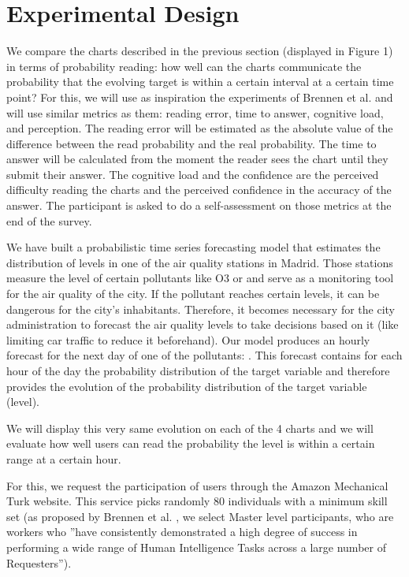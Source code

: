 \documentclass[a4paper,3p,sort&compress]{elsarticle}
\begin{document}
\section{Experimental Design}
\label{sec:exp_design}

We compare the charts described in the previous section (displayed in Figure 1)
in terms of probability
reading: how well
can the charts communicate the probability that the evolving target is within a certain interval
at a certain time point?
 For this, we will use as inspiration the experiments of Brennen et al. \cite{brennen_instrument_2018}
and will use similar metrics
as them: reading error, time to answer, cognitive load, and perception. The reading error will be estimated as the
absolute value of the difference between the read probability and the real probability. The time to answer
will be calculated from the moment the reader sees the chart until they submit their answer. The cognitive
load and the confidence are the perceived difficulty reading the charts and the perceived confidence in
the accuracy of
the answer. The participant is asked to do a self-assessment on those metrics at the end of the survey.

We have built a probabilistic time series forecasting model that estimates the distribution of \no
levels in one of the air quality stations in Madrid. Those stations measure the level of certain
pollutants like O3 or \no and serve as a monitoring tool for the air quality of the city. If the pollutant
reaches certain levels, it can be dangerous for the city's inhabitants. Therefore, it becomes necessary
for the city administration to
forecast the air quality levels to take decisions based on it (like limiting car traffic to reduce it beforehand).
Our model produces an hourly forecast for the next day of one of the pollutants: \no. This forecast contains
for each hour of the day the probability distribution of the target variable and therefore provides the evolution
of the probability distribution of the target variable (\no level).

We will display this very same evolution on each of the 4 charts and we will evaluate how well users can
read the probability the \no level is within a certain range at a certain hour.

For this, we request the participation of users through the Amazon Mechanical Turk website.
This service picks randomly 80 individuals with a minimum skill set (as proposed by Brennen
et al. \cite{brennen_instrument_2018}, we select Master level participants, who are workers who
''have consistently demonstrated a high degree of success in performing a wide range of Human Intelligence Tasks across a
large number of Requesters'').
\end{document}
